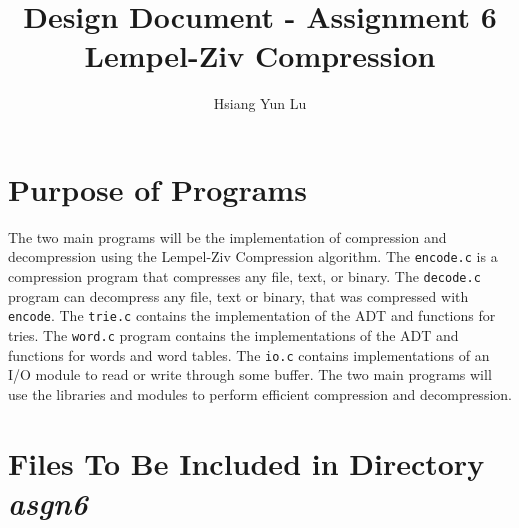 \documentclass[12pt]{article}
\title{Design Document - Assignment 6 Lempel-Ziv Compression}
\author{Hsiang Yun Lu}
\begin{document}
\maketitle

\section{Purpose of Programs}
The two main programs will be the implementation of compression and decompression using the Lempel-Ziv Compression algorithm. The \texttt{encode.c} is a compression program that compresses any file, text, or binary. The \texttt{decode.c} program can decompress any file, text or binary, that was compressed with \texttt{encode}. 
The \texttt{trie.c} contains the implementation of the ADT and functions for tries. The \texttt{word.c} program contains the implementations of the ADT and functions for words and word tables. The \texttt{io.c} contains implementations of an I/O module to read or write through some buffer. The two main programs will use the libraries and modules to perform efficient compression and decompression. \\

\section{Files To Be Included in Directory \textit{asgn6}}
\end{document}
